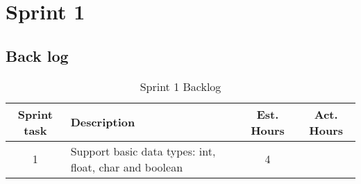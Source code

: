 \chapter{Sprint 1}

\section{Back log}

\begin{table}[ht] \center
\caption{Sprint 1 Backlog}
\begin{tabular}{c l c  c}
	Sprint task & Description & Est. Hours & Act. Hours \\
	\hline
	1 & Support basic data types: int, float, char and boolean & 4 & \\
\end{tabular}
\end{table}

